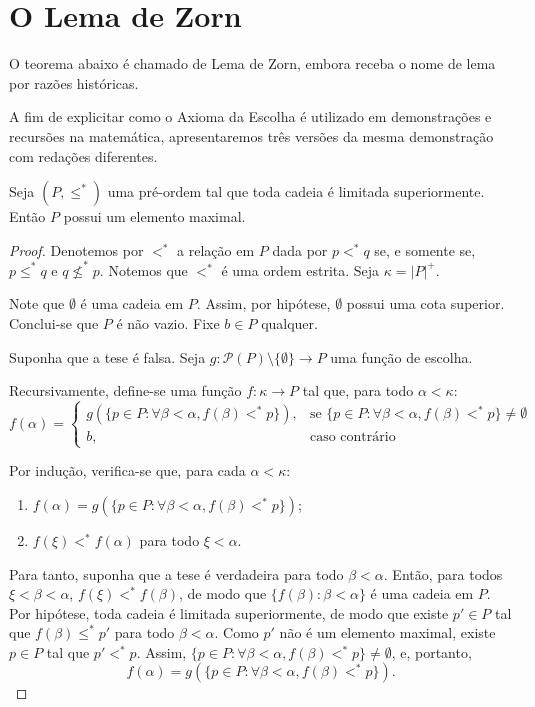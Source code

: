 \section{O Lema de Zorn}\label{sec:lemaDeZorn}

O teorema abaixo é chamado de Lema de Zorn, embora receba o nome de lema por razões históricas.
   
A fim de explicitar como o Axioma da Escolha é utilizado em demonstrações e recursões na matemática, apresentaremos três versões da mesma demonstração com redações diferentes.
\begin{theorem}[$ZFC^-$]\label{def:lemaDeZorn}
    Seja $(P, \leq^*)$ uma pré-ordem tal que toda cadeia é limitada superiormente.
    Então $P$ possui um elemento maximal.
\end{theorem}
\begin{proof}
    Denotemos por $<^*$ a relação em $P$ dada por $p<^* q$ se, e somente se, $p\leq^* q$ e $q\not\leq^* p$.
    Notemos que $<^*$ é uma ordem estrita.
    Seja $\kappa=|P|^+$.

    Note que $\emptyset$ é uma cadeia em $P$.
    Assim, por hipótese, $\emptyset$ possui uma cota superior.
    Conclui-se que $P$ é não vazio.
    Fixe $b \in P$ qualquer.

    Suponha que a tese é falsa.
    Seja $g:\mathcal P(P)\setminus\{\emptyset\}\to P$ uma função de escolha.
    

    Recursivamente, define-se uma função $f: \kappa\to P$ tal que, para todo $\alpha<\kappa$:
    \[
        f(\alpha)=\begin{cases}
        g(\{p\in P: \forall \beta<\alpha, f(\beta)<^* p\}), & \text{se } \{p\in P: \forall \beta<\alpha, f(\beta)<^* p\}\neq \emptyset\\
        b, & \text{caso contrário}
        \end{cases}
    \]

    Por indução, verifica-se que, para cada $\alpha<\kappa$:
    \begin{enumerate}[label=(\alph*)]
        \item $f(\alpha)=g(\{p\in P: \forall \beta<\alpha, f(\beta)<^* p\})$;
        \item $f(\xi)<^* f(\alpha)$ para todo $\xi<\alpha$.
    \end{enumerate}

    Para tanto, suponha que a tese é verdadeira para todo $\beta<\alpha$.
    Então, para todos $\xi<\beta<\alpha$, $f(\xi)<^* f(\beta)$, de modo que $\{f(\beta): \beta<\alpha\}$ é uma cadeia em $P$.
    Por hipótese, toda cadeia é limitada superiormente, de modo que existe $p'\in P$ tal que $f(\beta)\leq^* p'$ para todo $\beta<\alpha$.
    Como $p'$ não é um elemento maximal, existe $p\in P$ tal que $p'<^* p$.
    Assim, $\{p\in P: \forall \beta<\alpha, f(\beta)<^* p\}\neq \emptyset$, e, portanto,
    \[
        f(\alpha)=g(\{p\in P: \forall \beta<\alpha, f(\beta)<^* p\}).
    \]


\end{proof}
